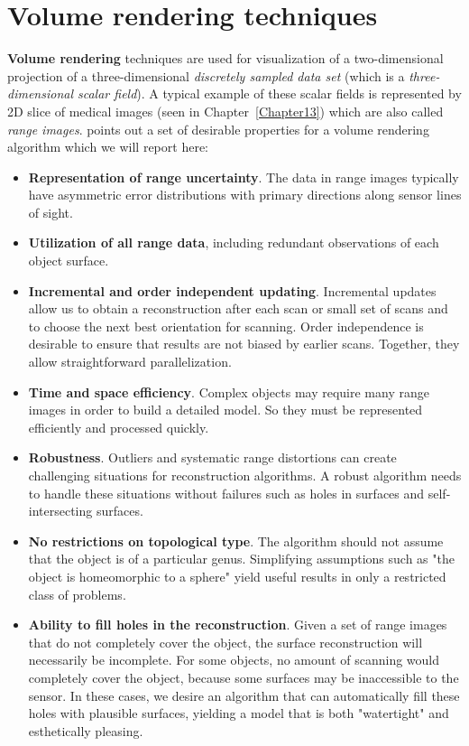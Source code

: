 \section{Volume rendering techniques}\label{sec14:volumeRendering}

\textbf{Volume rendering} techniques are used for visualization of a two-dimensional projection of a three-dimensional \textit{discretely sampled data set} (which is a \textit{three-dimensional scalar field}). A typical example of these scalar fields is represented by 2D slice of medical images (seen in Chapter~\ref{Chapter13}) which are also called \textit{range images}. \cite{Curless} points out a set of desirable properties for a volume rendering algorithm which we will report here:

\begin{itemize}
\item \textbf{Representation of range uncertainty}. The data in range images typically have asymmetric error distributions with primary directions along sensor lines of sight.
\item \textbf{Utilization of all range data}, including redundant observations of each object surface.
\item \textbf{Incremental and order independent updating}. Incremental updates allow us to obtain a reconstruction after each scan or small set of scans and to choose the next best orientation for scanning. Order independence is desirable to ensure that results are not biased by earlier scans. Together, they allow straightforward parallelization.
\item \textbf{Time and space efficiency}. Complex objects may require many range images in order to build a detailed model. So they must be represented efficiently and processed quickly.
\item \textbf{Robustness}. Outliers and systematic range distortions can create challenging situations for reconstruction algorithms. A robust algorithm needs to handle these situations without failures such as holes in surfaces and self-intersecting surfaces.
\item \textbf{No restrictions on topological type}. The algorithm should not assume that the object is of a particular genus. Simplifying assumptions such as "the object is homeomorphic to a sphere" yield useful results in only a restricted class of problems.
\item \textbf{Ability to fill holes in the reconstruction}. Given a set of range images that do not completely cover the object, the surface reconstruction will necessarily be incomplete. For some objects, no amount of scanning would completely cover the object, because some surfaces may be inaccessible to the sensor. In these
cases, we desire an algorithm that can automatically fill these holes with plausible surfaces, yielding a model that is both "watertight" and esthetically pleasing.
\end{itemize}

